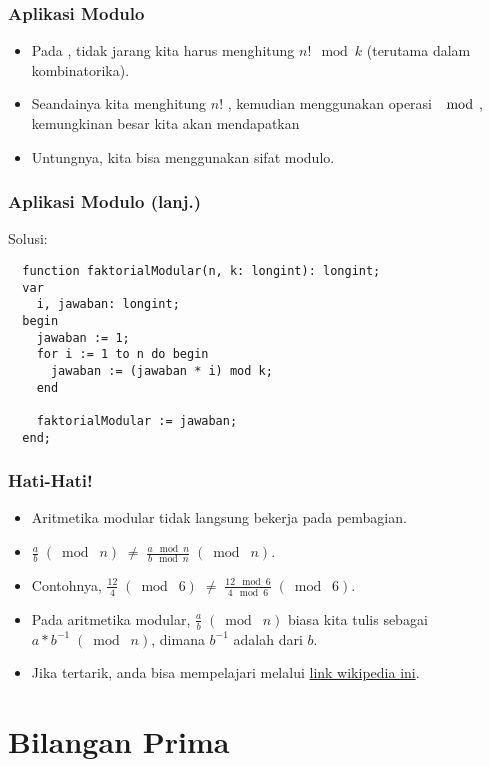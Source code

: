 \begin{frame}[fragile]
\frametitle{Aplikasi Modulo}
\begin{itemize}
  \item Pada , tidak jarang kita harus menghitung $n! \mod k$ (terutama dalam kombinatorika). 
  \item Seandainya kita menghitung $n!$ , kemudian menggunakan operasi $\mod$, kemungkinan besar kita akan mendapatkan 
  \item Untungnya, kita bisa menggunakan sifat modulo.
\end{itemize}
\end{frame}

\begin{frame}[fragile]
\frametitle{Aplikasi Modulo (lanj.)}
Solusi: 
\begin{lstlisting}
  function faktorialModular(n, k: longint): longint;
  var
    i, jawaban: longint;
  begin
    jawaban := 1;
    for i := 1 to n do begin
      jawaban := (jawaban * i) mod k;
    end

    faktorialModular := jawaban;
  end;  
\end{lstlisting}
\end{frame}

\begin{frame}
\frametitle{Hati-Hati!}
\begin{itemize}
  \item Aritmetika modular tidak langsung bekerja pada pembagian.
  \item $\frac{a}{b} \; (\bmod\; n) \; \neq \; \frac{a \mod n}{b \mod n} \; (\bmod\; n)$.
  \item Contohnya, $\frac{12}{4} \; (\bmod\; 6) \; \neq \; \frac{12 \mod 6}{4 \mod 6} \; (\bmod\; 6)$.
  \item Pada aritmetika modular, $\frac{a}{b} \; (\bmod\; n)$ biasa kita tulis sebagai $a * b^{-1}\;(\bmod\; n)$, dimana $b^{-1}$ adalah 
       dari $b$.
  \item Jika tertarik, anda bisa mempelajari  melalui \textcolor{blue}{\href{https://en.wikipedia.org/wiki/  Modular_multiplicative_inverse}{link wikipedia ini}.} 
\end{itemize}
\end{frame}

\section{Bilangan Prima}
\frame{\sectionpage}

